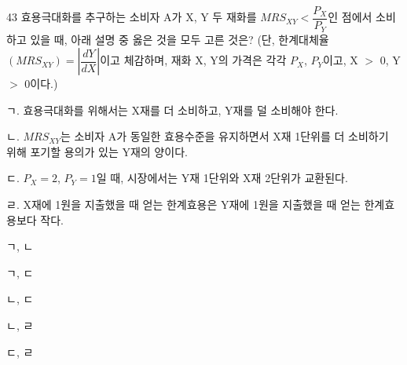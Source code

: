 \begin{question}{43}
효용극대화를 추구하는 소비자 A가 X, Y 두 재화를 $MRS_{XY}<\dfrac{P_{X}}{P_{Y}}$인 점에서 소비하고 있을 때, 아래 설명 중 옳은 것을 모두 고른 것은? (단, 한계대체율 $(MRS_{XY})=\left|\dfrac{dY}{dX}\right|$이고 체감하며, 재화 X, Y의 가격은 각각 $P_{X}$, $P_{Y}$이고, X $>$ 0, Y $>$ 0이다.)
\begin{framedtext}
ㄱ. 효용극대화를 위해서는 X재를 더 소비하고, Y재를 덜 소비해야 한다. \par
ㄴ. $MRS_{XY}$는 소비자 A가 동일한 효용수준을 유지하면서 X재 1단위를 더 소비하기 위해 포기할 용의가 있는 Y재의 양이다. \par
ㄷ. $P_{X}=2$, $P_{Y}=1$일 때, 시장에서는 Y재 1단위와 X재 2단위가 교환된다. \par
ㄹ. X재에 1원을 지출했을 때 얻는 한계효용은 Y재에 1원을 지출했을 때 얻는 한계효용보다 작다. \par
\end{framedtext}
\begin{choices}
  \item ㄱ, ㄴ
  \item ㄱ, ㄷ
  \item ㄴ, ㄷ
  \item ㄴ, ㄹ
  \item ㄷ, ㄹ
\end{choices}
\end{question}
